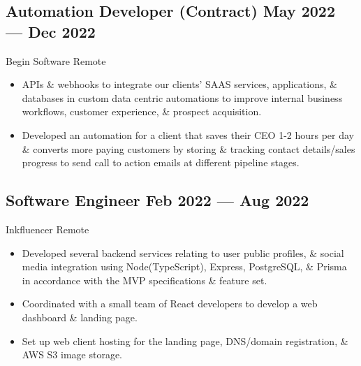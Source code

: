 \documentclass[a4,10pt]{article}
\newcommand{\subtext}[1]{
#1\par\vspace{-0.2cm}}
\newenvironment{zitemize}{
\begin{itemize}\itemsep0pt \parskip0pt \parsep1pt}
{\end{itemize}\vspace{-0.5cm}}
\begin{document}
\subsection*{Automation Developer {\normalsize \normalfont(Contract) } \hfill  May 2022 --- Dec 2022 }
\subtext{Begin Software \hfill Remote }  
    \begin{zitemize}
        \item APIs \& webhooks to integrate our clients' SAAS services, applications, \& databases in custom data centric automations to improve internal business workflows, customer experience, \& prospect acquisition.
        \item Developed an automation for a client that saves their CEO 1-2 hours per day \& converts more paying customers by storing \& tracking contact details/sales progress to send call to action emails at different pipeline stages.
    \end{zitemize}


\subsection*{Software Engineer {\normalsize \normalfont} \hfill  Feb 2022 --- Aug 2022 }
\subtext{Inkfluencer \hfill Remote }  
    \begin{zitemize}
        \item Developed several backend services relating to user public profiles, \& social media integration using Node(TypeScript), Express, PostgreSQL, \& Prisma in accordance with the MVP specifications \& feature set.
        \item Coordinated with a small team of React developers to develop a web dashboard \& landing page.
        \item Set up web client hosting for the landing page, DNS/domain registration, \& AWS S3 image storage.
    \end{zitemize}

\end{document}
